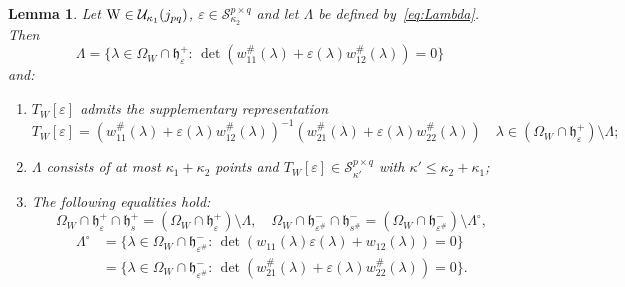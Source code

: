 \documentclass[12pt,twoside,a4paper]{amsart}
\newtheorem{lem}[thm]{Lemma}
\theoremstyle{definition}
\numberwithin{equation}{section}
\begin{document}
\begin{lem}\label{pr:2}
Let $\textup W\in {{\mathcal U}}_{\kappa_1}(j_{pq})$, $\varepsilon\in {\mathcal
S}_{\kappa_2}^{p\times q}$ and let $\Lambda$ be defined
by~\eqref{eq:Lambda}. Then
\begin{equation}
\label{eq:may11a9}
\Lambda=\{\lambda\in \Omega_W\cap {{\mathfrak h}}_\varepsilon^+:\,
\det(w_{11}^\#(\lambda)+
\varepsilon(\lambda)w_{12}^\#(\lambda))=0\}
\end{equation}
and:
\begin{enumerate}
\item[\rm(1)]
 $T_W[\varepsilon]$ admits the supplementary representation
\begin{equation}\label{eq:2.7}
    T_W[\varepsilon]=(w_{11}^\#({\lambda})+\varepsilon({\lambda})w^\#_{12}({\lambda}))^{-1}
    (w_{21}^\#({\lambda})+\varepsilon({\lambda})w^\#_{22}({\lambda}))\quad
    {\lambda}\in(\Omega_W\cap {{\mathfrak h}}_\varepsilon^+)\setminus\Lambda;
\end{equation}
\item[\rm(2)]
$\Lambda$ consists of at most $\kappa_1+\kappa_2$ points and
$T_W[\varepsilon]\in {\mathcal S}_{\kappa'}^{p\times q}$ with
$\kappa'\leq\kappa_2+\kappa_1$; \vskip 6pt
\item[\rm(3)]
The following equalities hold:
\begin{equation}\label{eq:Hol}
\Omega_W\cap {{\mathfrak h}}_\varepsilon^+\cap {{\mathfrak h}}_s^+=(\Omega_W\cap
{{\mathfrak h}}_\varepsilon^+)\setminus\Lambda,\quad \Omega_W\cap
{{\mathfrak h}}_{\varepsilon^\#}^-\cap {{\mathfrak h}}_{s^\#}^-=(\Omega_W\cap
{{\mathfrak h}}_{\varepsilon^\#}^-)\setminus\Lambda^\circ,
\end{equation}
\[
\begin{split}
\Lambda^\circ&=\{\lambda\in \Omega_W\cap {{\mathfrak h}}_{\varepsilon^\#}^-:\, \det (w_{11}(\lambda)\varepsilon(\lambda)+w_{12}(\lambda))=0\}\\
&=\{\lambda\in \Omega_W\cap {{\mathfrak h}}_{\varepsilon^\#}^-:\,\det
(w_{21}^\#(\lambda)+\varepsilon(\lambda) w_{22}^\#(\lambda))=0\}.
\end{split}
\]
\end{enumerate}
\end{lem}
\end{document}
